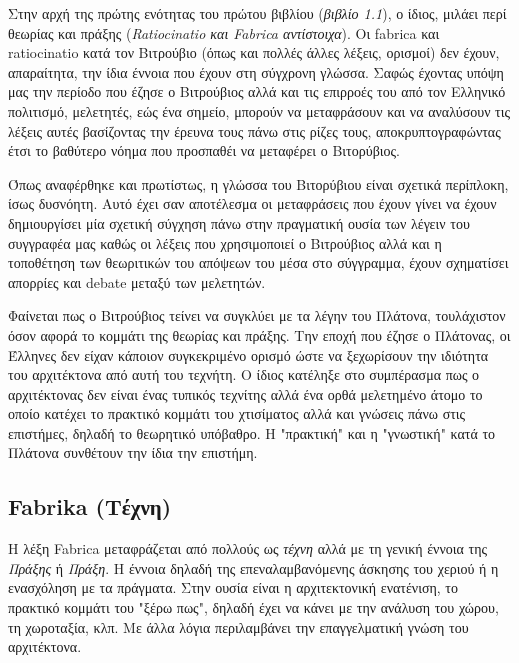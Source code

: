 Στην αρχή της πρώτης ενότητας του πρώτου βιβλίου (\emph{βιβλίο 1.1}), ο ίδιος, μιλάει περί θεωρίας και πράξης (\emph{Ratiocinatio και Fabrica αντίστοιχα}). \cite[σ. 37]{vitruvius-lefas} Οι fabrica και ratiocinatio κατά τον Βιτρούβιο (όπως και πολλές άλλες λέξεις, ορισμοί) δεν έχουν, απαραίτητα, την ίδια έννοια που έχουν στη σύγχρονη γλώσσα. Σαφώς έχοντας υπόψη μας την περίοδο που έζησε ο Βιτρούβιος αλλά και τις επιρροές του από τον Ελληνικό πολιτισμό, μελετητές, εώς ένα σημείο, μπορούν να μεταφράσουν και να αναλύσουν τις λέξεις αυτές βασίζοντας την έρευνα τους πάνω στις ρίζες τους, αποκρυπτογραφώντας έτσι το βαθύτερο νόημα που προσπαθέι να μεταφέρει ο Βιτορύβιος.\cite{graham-education} 

Όπως αναφέρθηκε και πρωτίστως, η γλώσσα του Βιτορύβιου είναι σχετικά περίπλοκη, ίσως δυσνόητη. Αυτό έχει σαν αποτέλεσμα οι μεταφράσεις που έχουν γίνει να έχουν δημιουργίσει μία σχετική σύγχηση πάνω στην πραγματική ουσία των λέγειν του συγγραφέα μας καθώς οι λέξεις που χρησιμοποιεί ο Βιτρούβιος αλλά και η τοποθέτηση των θεωριτικών του απόψεων του μέσα στο σύγγραμμα, έχουν σχηματίσει απορρίες και debate μεταξύ των μελετητών.

Φαίνεται πως ο Βιτρούβιος τείνει να συγκλύει με τα λέγην του Πλάτονα, τουλάχιστον όσον αφορά το κομμάτι της θεωρίας και πράξης. Την εποχή που έζησε ο Πλάτονας, οι Έλληνες δεν είχαν κάποιον συγκεκριμένο ορισμό ώστε να ξεχωρίσουν την ιδιότητα του αρχιτέκτονα από αυτή του τεχνήτη. Ο ίδιος κατέληξε στο συμπέρασμα πως ο αρχιτέκτονας δεν είναι ένας τυπικός τεχνίτης αλλά ένα ορθά μελετημένο άτομο το οποίο κατέχει το πρακτικό κομμάτι του χτισίματος αλλά και γνώσεις πάνω στις επιστήμες, δηλαδή το θεωρητικό υπόβαθρο. Η "πρακτική" και η "γνωστική" κατά το Πλάτονα συνθέτουν την ίδια την επιστήμη. \cite{graham-education}

\subsection{Fabrika (Τέχνη)}

Η λέξη Fabrica μεταφράζεται από πολλούς ως \emph{τέχνη} αλλά με τη γενική έννοια της \emph{Πράξης} ή \emph{Πράξη}. \cite[σ. 85]{vitruvius-lefas,graham-education} Η έννοια δηλαδή της επεναλαμβανόμενης άσκησης του χεριού ή η ενασχόληση με τα πράγματα. Στην ουσία είναι η αρχιτεκτονική ενατένιση, το πρακτικό κομμάτι του "ξέρω πως", δηλαδή έχει να κάνει με την ανάλυση του χώρου, τη χωροταξία, κλπ. Με άλλα λόγια περιλαμβάνει την επαγγελματική γνώση του αρχιτέκτονα. \cite{graham-education}

